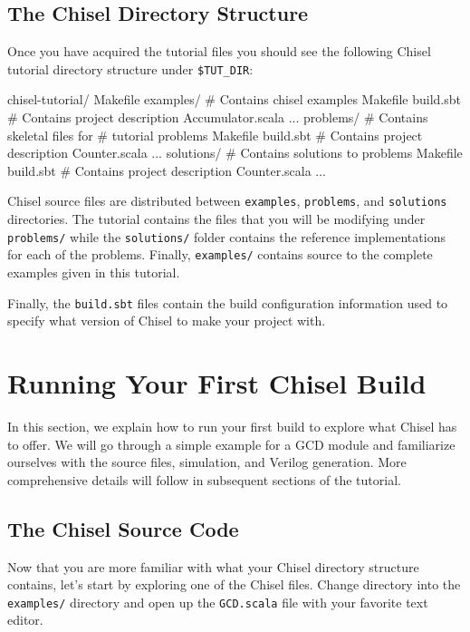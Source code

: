 \subsection{The Chisel Directory Structure}

Once you have acquired the tutorial files you should see the following Chisel tutorial directory structure under \verb+$TUT_DIR+:

\begin{bash}
chisel-tutorial/  
  Makefile
  examples/   # Contains chisel examples
    Makefile  
    build.sbt # Contains project description
    Accumulator.scala ...
  problems/   # Contains skeletal files for 
              # tutorial problems
    Makefile
    build.sbt # Contains project description
    Counter.scala ...
  solutions/  # Contains solutions to problems
    Makefile
    build.sbt # Contains project description
    Counter.scala ...
\end{bash}

Chisel source files are distributed between \verb+examples+, \verb+problems+, and \verb+solutions+ directories.
The tutorial contains the files that you will be modifying under \verb+problems/+ while the \verb+solutions/+ folder contains the reference implementations for each of the problems.  Finally, \verb+examples/+ contains source to the complete examples given in this tutorial.

Finally, the \verb+build.sbt+ files contain the build configuration information used to specify what version of Chisel to make your project with.

\section{Running Your First Chisel Build}

In this section, we explain how to run your first build to explore what Chisel has to offer. We will go through a simple example for a GCD module and familiarize ourselves with the source files, simulation, and Verilog generation. More comprehensive details will follow in subsequent sections of the tutorial.

\subsection{The Chisel Source Code}

Now that you are more familiar with what your Chisel directory structure contains, let's start by exploring one of the Chisel files. Change directory into the \verb+examples/+ directory and open up the \verb+GCD.scala+ file with your favorite text editor. 

